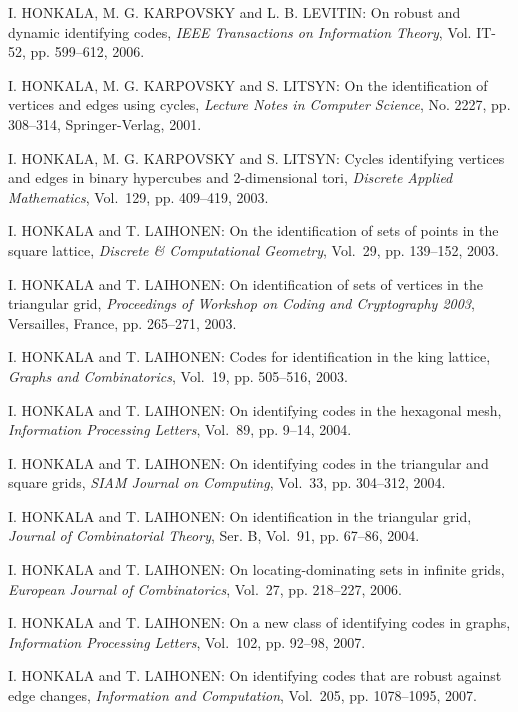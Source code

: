 \begin{thebibliography}{999}
I. HONKALA, M. G. KARPOVSKY and L. B. LEVITIN: On robust and dynamic identifying codes, {\it IEEE Transactions on Information Theory}, Vol. IT-52, pp. 599--612, 2006.

I. HONKALA, M. G. KARPOVSKY and S. LITSYN: On the identification of vertices and edges using cycles, {\it Lecture Notes in Computer Science}, No. 2227, pp. 308--314, Springer-Verlag, 2001.

I. HONKALA, M. G. KARPOVSKY and S. LITSYN: Cycles identifying vertices and edges in binary hypercubes and 2-dimensional tori, {\it Discrete Applied Mathematics}, Vol.~129, pp. 409--419, 2003.

I. HONKALA and T. LAIHONEN: On the identification of sets of points in the square lattice, {\it Discrete \& Computational Geometry}, Vol.~29, pp. 139--152, 2003.

I. HONKALA and T. LAIHONEN: On identification of sets of vertices in the triangular grid, {\it Proceedings of Workshop on Coding and Cryptography 2003}, Versailles, France, pp. 265--271, 2003.

I. HONKALA and T. LAIHONEN: Codes for identification in the king lattice, {\it Graphs and Combinatorics}, Vol.~19, pp. 505--516, 2003.

I. HONKALA and T. LAIHONEN: On identifying codes in the hexagonal mesh, {\it Information Processing Letters}, Vol.~89, pp. 9--14, 2004.

I. HONKALA and T. LAIHONEN: On identifying codes in the triangular and square grids, {\it SIAM Journal on Computing}, Vol.~33, pp. 304--312, 2004.

I. HONKALA and T. LAIHONEN: On identification in the triangular grid, {\it Journal of Combinatorial Theory}, Ser. B, Vol.~91, pp. 67--86, 2004.

I. HONKALA and T. LAIHONEN: On locating-dominating sets in infinite grids, {\it European Journal of Combinatorics}, Vol.~27, pp. 218--227, 2006.

I. HONKALA and T. LAIHONEN: On a new class of identifying codes in graphs, {\it Information Processing Letters}, Vol.~102, pp. 92--98, 2007.

I. HONKALA and T. LAIHONEN: On identifying codes that are robust against edge changes, {\it Information and Computation}, Vol.~205, pp. 1078--1095, 2007.


\end{thebibliography}
